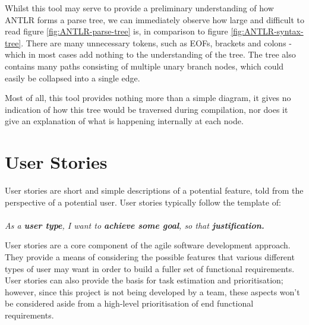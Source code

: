 \documentclass{l4proj}
\begin{document}
Whilst this tool may serve to provide a preliminary understanding of how ANTLR forms a parse tree, we can immediately observe how large and difficult to read figure \ref{fig:ANTLR-parse-tree} is, in comparison to figure \ref{fig:ANTLR-syntax-tree}. There are many unnecessary tokens, such as EOFs, brackets and colons - which in most cases add nothing to the understanding of the tree. The tree also contains many paths consisting of multiple unary branch nodes, which could easily be collapsed into a single edge.

Most of all, this tool provides nothing more than a simple diagram, it gives no indication of how this tree would be traversed during compilation, nor does it give an explanation of what is happening internally at each node. 

\section{User Stories}
User stories are short and simple descriptions of a potential feature, told from the perspective of a potential user. User stories typically follow the template of:\\\\
\textit{As a \textbf{user type}, I want to \textbf{achieve some goal}, so that \textbf{justification.}}

User stories are a core component of the agile software development approach. They provide a means of considering the possible features that various different types of user may want in order to build a fuller set of functional requirements. User stories can also provide the basis for task estimation and prioritisation; however, since this project is not being developed by a team, these aspects won't be considered aside from a high-level prioritisation of end functional requirements.
\end{document}
